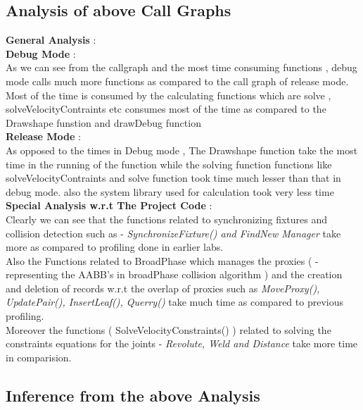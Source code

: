 \documentclass[11pt]{article}
\begin{document}
\subsection{Analysis of above Call Graphs}
\textbf{General Analysis} :\\
\textbf{Debug Mode} :\\
As we can see from the callgraph and the most time consuming functions , debug mode calls much more functions as compared to the call graph of release mode.
Most of the time is consumed by the calculating functions which are solve , solveVelocityContraints etc 
consumes most of the time as compared to the Drawshape funstion and drawDebug function\\
\textbf{Release Mode} :\\
As opposed to the times in Debug mode , The Drawshape function take the most time in the running of the function while the solving function functions like
solveVelocityContraints and solve function took time much lesser than that in debug mode. also the system library used for calculation took very less
time \\
\textbf{Special Analysis w.r.t The Project Code } : \\
Clearly we can see that the functions related to synchronizing fixtures and collision detection such as - \emph{SynchronizeFixture() and FindNew Manager}
take more as compared to profiling done in earlier labs.\\
Also the Functions related to BroadPhase which manages the proxies ( - representing the AABB's in broadPhase collision algorithm ) 
and the creation and deletion of records w.r.t the overlap of proxies such as
\emph{MoveProxy(), UpdatePair(), InsertLeaf(), Querry()} take much time as compared to previous profiling. \\
Moreover the functions ( SolveVelocityConstraints() )  related to solving the constraints equations for the joints - \emph{Revolute, Weld and Distance} take more time in comparision.


\subsection{Inference from the above Analysis}
\end{document}

